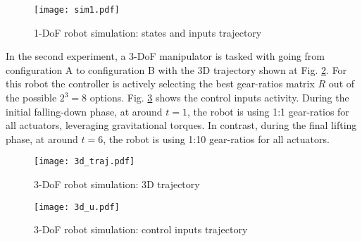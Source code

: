 %
\begin{figure}[htp]
	\centering
		\texttt{[image: sim1.pdf]}
	\caption{1-DoF robot simulation: states and inputs trajectory}
	\label{fig:sim1}
\end{figure}
%
%
%
%
%
In the second experiment, a 3-DoF manipulator is tasked with going from configuration A to configuration B with the 3D trajectory shown at Fig. \ref{fig:3d_traj}. For this robot the controller is actively selecting the best gear-ratios matrix $R$ out of the possible $2^3=8$ options. Fig. \ref{fig:3d_u} shows the control inputs activity. During the initial falling-down phase, at around $t=1$, the robot is using 1:1 gear-ratios for all actuators, leveraging gravitational torques. In contrast, during the final lifting phase, at around $t=6$, the robot is using 1:10 gear-ratios for all actuators. 
%
%
%
\begin{figure}[htp]
	\centering
		\texttt{[image: 3d\_traj.pdf]}
	\caption{ 3-DoF robot simulation: 3D trajectory }
	\label{fig:3d_traj}
\end{figure}
%
%
\begin{figure}[htp]
	\centering
		\texttt{[image: 3d\_u.pdf]}
	\caption{ 3-DoF robot simulation: control inputs trajectory}
	\label{fig:3d_u}
\end{figure}
%




